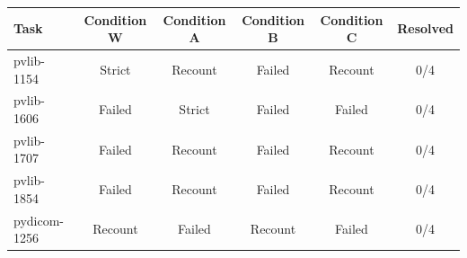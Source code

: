 \begin{tabular}{lccccc}
\toprule
Task & Condition W & Condition A & Condition B & Condition C & Resolved \\
\midrule
pvlib-1154 & Strict & Recount & Failed & Recount & 0/4 \\
pvlib-1606 & Failed & Strict & Failed & Failed & 0/4 \\
pvlib-1707 & Failed & Recount & Failed & Recount & 0/4 \\
pvlib-1854 & Failed & Recount & Failed & Recount & 0/4 \\
pydicom-1256 & Recount & Failed & Recount & Failed & 0/4 \\
\bottomrule
\end{tabular}
